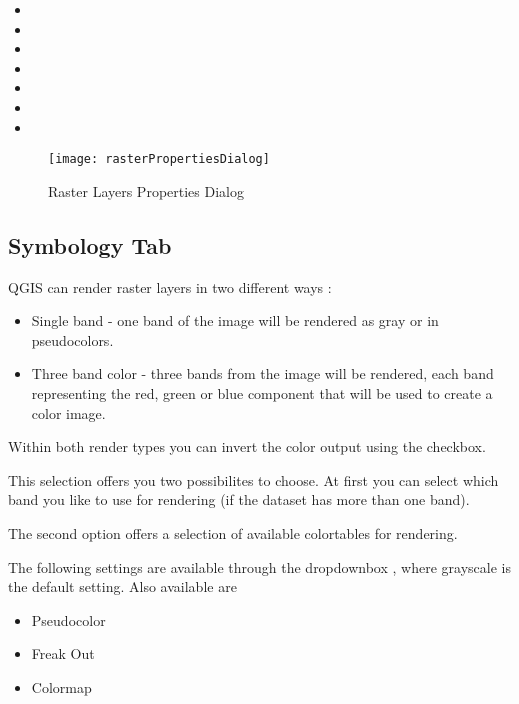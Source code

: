 \begin{itemize}[label=--]
 \item {}
 \item {}
 \item {}
 \item {}
 \item {}
 \item {}
 \item {}
\end{itemize}

\begin{figure}[h]
  \centering
   \texttt{[image: rasterPropertiesDialog]}
   \caption{Raster Layers Properties Dialog \nixcaption}\label{fig:raster_properties}
\end{figure}

\subsection{Symbology Tab}\label{label_sombology}

QGIS can render raster layers in two different ways :

\begin{itemize}[label=--]
\item Single band - one band of the image will be rendered as gray or in
pseudocolors.
\item Three band color - three bands from the image will be rendered, each
band representing the red, green or blue component that will be used to create
a color image.
\end{itemize}

Within both render types you can invert the color output using the
 checkbox.


This selection offers you two possibilites to choose. At first you can
select which band you like to use for rendering (if the dataset has more than
one band).

The second option offers a selection of available colortables for rendering.

The following settings are available through the dropdownbox
, where grayscale is the default
setting.
Also available are
\begin{itemize}[label=--]
\item Pseudocolor
\item Freak Out
\item Colormap
\end{itemize}

